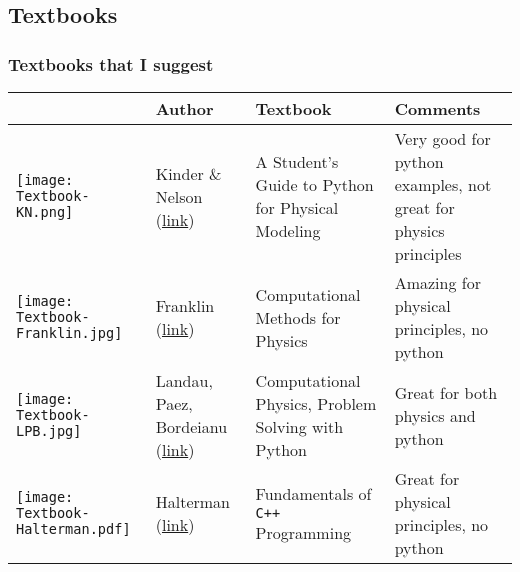 \documentclass[hyperref={colorlinks=true}]{beamer}
\begin{document}
\subsection[Textbooks]{Textbooks}

\begin{frame}[shrink=15]
  \frametitle{Textbooks that I suggest}

  \begin{table}[htbp]
  \centering
  \begin{tabular}{b{} b{3cm} b{5cm} b{3.5cm} }
    \hline
     & Author & Textbook & Comments \\ 
    \hline
    \texttt{[image: Textbook-KN.png]} & Kinder \& Nelson (\href{http://physicalmodelingwithpython.blogspot.com/}{link}) & A Student's Guide to Python for Physical Modeling & Very good for python examples, not great for physics principles \\ 
    \texttt{[image: Textbook-Franklin.jpg]} & Franklin (\href{http://www.reed.edu/physics/courses/P367.F14oldX!/downloads/index.html}{link}) & Computational Methods for Physics & Amazing for physical principles, no python \\ 
    \texttt{[image: Textbook-LPB.jpg]} & Landau, Paez, Bordeianu (\href{http://physics.oregonstate.edu/~landaur/Books/CPbook/Codes/}{link})  & Computational Physics, Problem Solving with Python & Great for both physics and python \\ 
    \texttt{[image: Textbook-Halterman.pdf]} & Halterman (\href{http://python.cs.southern.edu/cppbook/progcpp.pdf}{link}) & Fundamentals of \texttt{C++} Programming & Great for physical principles, no python \\ 
    \hline
  \end{tabular}
  \end{table}
  
  
\end{frame}

\end{document}

